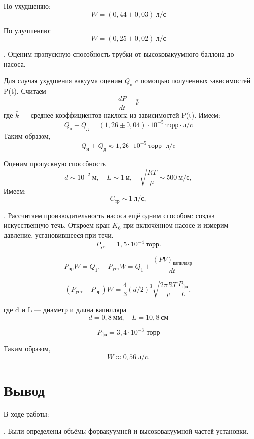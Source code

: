 \documentclass[a4paper,12pt]{article} %
\begin{document}
\medskip

\noindent По ухудшению:
	$$W = (0,44\pm0,03) ~\text{л/с}$$
	
\medskip	
	
\noindent По улучшению:
	$$W = (0,25\pm0,02) ~\text{л/с}$$

\medskip

. Оценим пропускную способность трубки от высоковакуумного баллона до насоса.

\medskip

\noindent Для случая ухудшения вакуума оценим $Q_\text{н}$ c помощью полученных зависимостей P(t). Считаем $$\frac{dP}{dt} = \bar{k}$$ где $\bar{k}$ --- среднее коэффициентов наклона из зависимостей P(t). Имеем:
	$$Q_\text{н} + Q_\text{д} = (1,26\pm0,04)\cdot 10^{-5} ~\text{торр}\cdot\text{л/c}$$
	\noindent Таким образом,
	$$Q_\text{н} + Q_\text{д} \approx 1,26\cdot 10^{-5} ~\text{торр}\cdot\text{л/c}$$

\noindent Оценим пропускную способность
  $$d \sim 10^{-2}~\text{м},\quad L \sim 1 ~\text{м},\quad \sqrt{\frac{RT}{\mu}} \sim 500 ~\text{м/с},$$ 
	 Имеем:
	$$C_\text{тр} \sim 1 ~\text{л/с},$$

\medskip

. Рассчитаем производительность насоса ещё одним способом: создав искусственную течь. Откроем кран $K_6$ при включённом  насосе и измерим давление, установившееся при течи.
 $$P_\text{уст} = 1,5 \cdot 10^{-4} ~\text{торр}.$$

		$$P_\text{пр}W = Q_1, \quad P_\text{уст}W = Q_1 + \frac{(PV)_\text{капилляр}}{dt}$$
		
$$(P_\text{уст} - P_\text{пр})W = \frac{4}{3}(d/2)^3\sqrt{\frac{2\pi RT}{\mu}}\frac{P_\text{фв}}{L},$$

\noindent где d и L --- диаметр и длина капилляра
	$$d = 0,8 ~\text{мм},\quad L = 10,8 ~\text{см}$$
	
	$$P_\text{фв}= 3,4 \cdot 10^{-3} \text{ торр}$$

\noindent Таким образом,
	$$W \approx 0,56 ~\text{л/c}.$$

\medskip

\section{Вывод}

В ходе работы:

\medskip
  
. Были определены объёмы форвакуумной и высоковакуумной частей установки. 
\end{document}

